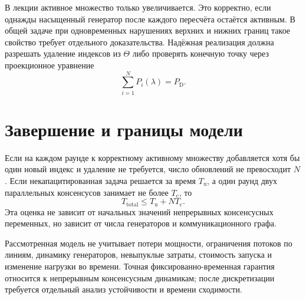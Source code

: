 В лекции активное множество только увеличивается. Это корректно, если
однажды насыщенный генератор после каждого пересчёта остаётся
активным. В общей задаче при одновременных нарушениях верхних и нижних
границ такое свойство требует отдельного доказательства. Надёжная
реализация должна разрешать удаление индексов из \(\Theta\) либо
проверять конечную точку через проекционное уравнение
\[
    \sum_{i=1}^{N}P_i(\lambda)=P_{\mathrm D}.
\]

\section{Завершение и границы модели}

Если на каждом раунде к корректному активному множеству добавляется
хотя бы один новый индекс и удаление не требуется, число обновлений не
превосходит \(N\). Если некапацитированная задача решается за время
\(T_{\mathrm u}\), а один раунд двух параллельных консенсусов занимает
не более \(T_{\mathrm c}\), то
\[
    T_{\mathrm{total}}
    \le
    T_{\mathrm u}+NT_{\mathrm c}.
\]
Эта оценка не зависит от начальных значений непрерывных консенсусных
переменных, но зависит от числа генераторов и коммуникационного графа.

Рассмотренная модель не учитывает потери мощности, ограничения потоков
по линиям, динамику генераторов, невыпуклые затраты, стоимость запуска
и изменение нагрузки во времени. Точная фиксированно-временная
гарантия относится к непрерывным консенсусным динамикам; после
дискретизации требуется отдельный анализ устойчивости и времени
сходимости.
